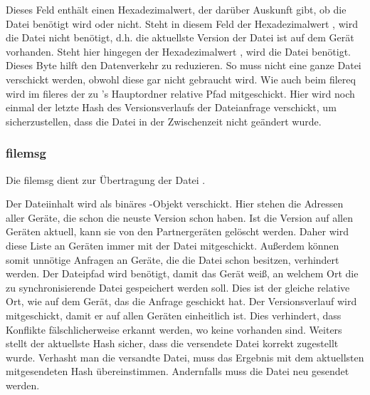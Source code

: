 \begin{description}
		Dieses Feld enthält einen Hexadezimalwert, der darüber Auskunft gibt, ob die Datei benötigt wird oder nicht. Steht in diesem Feld der Hexadezimalwert , wird die Datei nicht benötigt, d.h. die aktuellste Version der Datei ist auf dem Gerät vorhanden. Steht hier hingegen der Hexadezimalwert , wird die Datei benötigt. Dieses Byte hilft den Datenverkehr zu reduzieren. So muss nicht eine ganze Datei verschickt werden, obwohl diese gar nicht gebraucht wird.
		Wie auch beim \gls{filereq} wird im \gls{fileres} der zu \sblit's Hauptordner relative Pfad mitgeschickt.
		Hier wird noch einmal der letzte Hash des Versionsverlaufs der Dateianfrage verschickt, um sicherzustellen, dass die Datei in der Zwischenzeit nicht geändert wurde. 
\end{description}
		
\subsubsection{\gls{filemsg}}
\sblitfilemsgbytefield
Die \gls{filemsg} dient zur Übertragung der Datei .
\begin{description}
		Der Dateiinhalt wird als binäres -Objekt verschickt.
		Hier stehen die Adressen aller Geräte, die schon die neuste Version schon haben. Ist die Version auf allen Geräten aktuell, kann sie von den Partnergeräten gelöscht werden. Daher wird diese Liste an Geräten immer mit der Datei mitgeschickt. Außerdem können somit unnötige Anfragen an Geräte, die die Datei schon besitzen, verhindert werden.
		Der Dateipfad wird benötigt, damit das Gerät weiß, an welchem Ort die zu synchronisierende Datei gespeichert werden soll. Dies ist der gleiche relative Ort, wie auf dem Gerät, das die Anfrage geschickt hat.
		Der Versionsverlauf wird mitgeschickt, damit er auf allen Geräten einheitlich ist. Dies verhindert, dass Konflikte fälschlicherweise erkannt werden, wo keine vorhanden sind. Weiters stellt der aktuellste Hash sicher, dass die versendete Datei korrekt zugestellt wurde. Verhasht man die versandte Datei, muss das Ergebnis mit dem aktuellsten mitgesendeten Hash übereinstimmen. Andernfalls muss die Datei neu gesendet werden.
\end{description}
		
